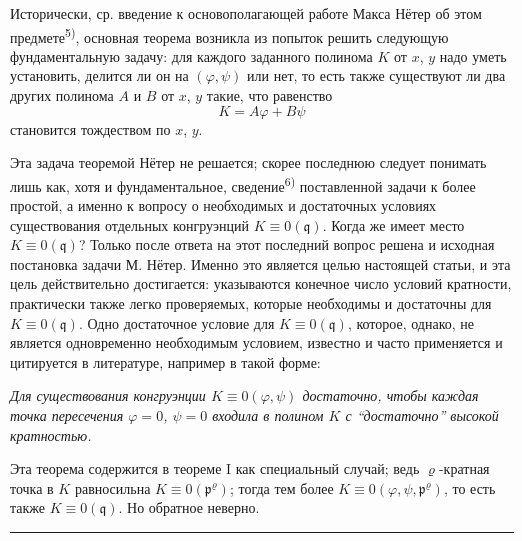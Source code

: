 \documentclass[11pt]{article}
\theoremstyle{plain}
\begin{document}
Исторически, ср. введение к основополагающей работе Макса Нётер об
этом предмете\textsuperscript{5)}, основная теорема возникла из
попыток решить следующую фундаментальную задачу: для каждого
заданного полинома $K$ от $x$, $y$ надо уметь установить, делится ли
он на $(\varphi, \psi)$ или нет, то есть также существуют ли два
других полинома $A$ и $B$ от $x$, $y$ такие, что равенство
\[
K = A\varphi + B\psi
\]
становится тождеством по $x$, $y$.

Эта задача теоремой Нётер не решается; скорее последнюю следует
понимать лишь как, хотя и фундаментальное, сведение\textsuperscript{6)}
поставленной задачи к более простой, а именно к вопросу о
необходимых и достаточных условиях существования отдельных
конгруэнций $K \equiv 0(\mathfrak{q})$. Когда же имеет место
$K \equiv 0(\mathfrak{q})$? Только после ответа на этот последний
вопрос решена и исходная постановка задачи М. Нётер. Именно это
является целью настоящей статьи, и эта цель действительно достигается:
указываются конечное число условий кратности, практически также
легко проверяемых, которые необходимы и достаточны для
$K \equiv 0(\mathfrak{q})$. Одно достаточное условие для
$K \equiv 0(\mathfrak{q})$, которое, однако, не является одновременно
необходимым условием, известно и часто применяется и цитируется в
литературе, например в такой форме:

\smallskip
\textit{Для существования конгруэнции $K \equiv 0(\varphi, \psi)$
достаточно, чтобы каждая точка пересечения $\varphi = 0$, $\psi = 0$
входила в полином $K$ с ``достаточно'' высокой кратностью.}

\smallskip
Эта теорема содержится в теореме I как специальный случай; ведь
$\varrho$-кратная точка в $K$ равносильна
$K \equiv 0(\mathfrak{p}^{\varrho})$; тогда тем более
$K \equiv 0(\varphi, \psi, \mathfrak{p}^{\varrho})$, то есть также
$K \equiv 0(\mathfrak{q})$. Но обратное неверно.

\vspace{0.5em}
\noindent\rule{\textwidth}{0.4pt}
\vspace{0.3em}
\end{document}
